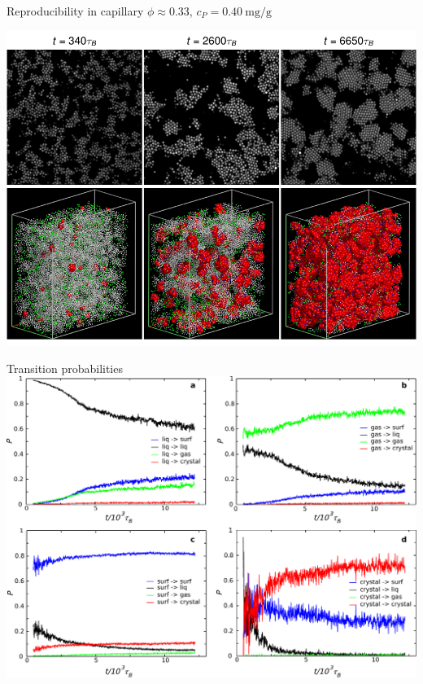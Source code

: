\documentclass[xcolor=table]{beamer}
\begin{document}
\appendix
{}
\setcounter{finalframe}{\value{framenumber}}

\begin{frame}[plain]
\end{frame}

\begin{frame}{Reproducibility in capillary}
	\hfill $\phi\approx 0.33$, $c_P=\SI{0.40}{\milli\gram/\gram}$
	
	\includegraphics[width=\textwidth]{nature/capillary}
\end{frame}

\begin{frame}{Transition probabilities}
	\vspace{\baselineskip}
	\includegraphics[width=\textwidth]{nature/sfig1.pdf}
\end{frame}
\end{document}
